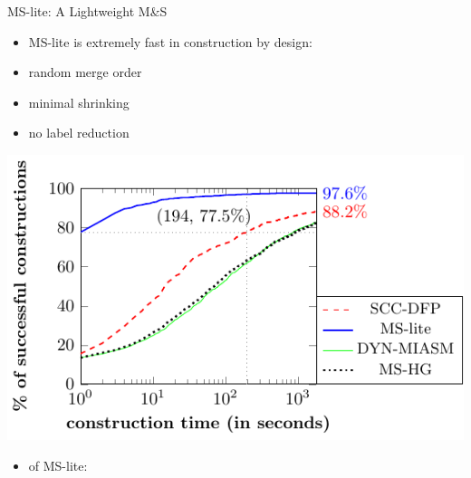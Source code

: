 \begin{myblock}{MS-lite: A Lightweight M\&S}
\Large
\begin{itemize}
\item MS-lite is extremely fast in construction by design:
\end{itemize}

\hspace*{0.5in}
\begin{minipage}{\textwidth}
\begin{itemize}
\item random merge order
\item minimal  shrinking
\item no label reduction
\end{itemize}
\end{minipage}

\begin{center}
\includegraphics[scale=2.5]{pdfs/time-cdf-figure0.pdf}
\end{center}

\begin{itemize}
\item {} of MS-lite:
\end{itemize}


\end{myblock}
